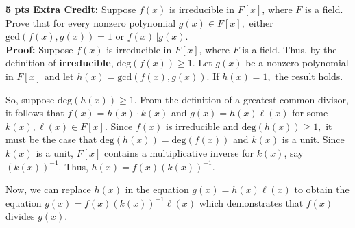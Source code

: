 \documentclass[12pt]{article}
\renewcommand{\emph}[1]{\textsf{\textbf{#1}}}
\begin{document}
\textbf{5 pts Extra Credit:} Suppose $f(x)$ is irreducible in $F[x]$, where $F$ is a field. Prove that for every nonzero polynomial $g(x) \in F[x],$ either $\text{gcd}(f(x),g(x))=1$ or $f(x) \, \big\vert g(x).$\\

\textbf{Proof:} Suppose $f(x)$ is irreducible in $F[x]$, where $F$ is a field. Thus, by the definition of \emph{irreducible}, $\text{deg}(f(x))\geq 1.$ Let $g(x)$ be a nonzero polynomial in $F[x]$ and let $h(x)=\text{gcd}(f(x),g(x)).$ If $h(x)=1,$ the result holds.

So, suppose $\text{deg}(h(x)) \geq 1.$ From the definition of a greatest common divisor, it follows that $f(x)=h(x)\cdot k(x)$ and $g(x)=h(x)\ell(x)$ for some $k(x),\ell(x) \in F[x].$ Since $f(x)$ is irreducible and $\text{deg}(h(x)) \geq 1,$ it must be the case that $\text{deg}(h(x))=\text{deg}(f(x))$ and $k(x) $ is a unit. Since $k(x) $ is a unit, $F[x]$ contains a multiplicative inverse for $k(x)$, say  $(k(x))^{-1}.$ Thus, $h(x)=f(x)(k(x))^{-1}.$

 Now, we can replace $h(x)$ in the equation $g(x)=h(x)\ell(x)$ to obtain the equation $g(x)=f(x) (k(x))^{-1}\ell(x)$ which demonstrates that $f(x)$ divides $g(x).$

\vspace{3in}
\end{document}
